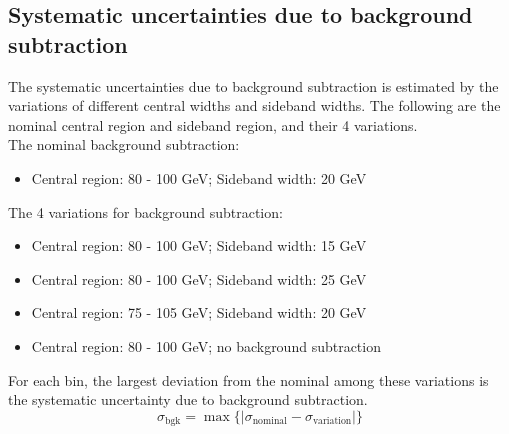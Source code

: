 \subsection{Systematic uncertainties due to background subtraction}
\label{sec:sys_background_subtraction}
The systematic uncertainties due to background subtraction is estimated by the variations of different central widths and sideband widths.
The following are the nominal central region and sideband region, and their 4 variations. \\
The nominal background subtraction:
\begin{itemize}
\item Central region: 80 - 100 GeV; Sideband width: 20 GeV
\end{itemize}
The 4 variations for background subtraction:
\begin{itemize}
\item Central region: 80 - 100 GeV; Sideband width: 15 GeV
\item Central region: 80 - 100 GeV; Sideband width: 25 GeV
\item Central region: 75 - 105 GeV; Sideband width: 20 GeV
\item Central region: 80 - 100 GeV; no background subtraction
\end{itemize}

For each bin, the largest deviation from the nominal among these variations is the systematic uncertainty due to background subtraction.
\begin{equation}
\sigma_{\text{bgk}} = \max \{| \sigma_{\text{nominal}} - \sigma_{\text{variation}} |\}
\end{equation}

